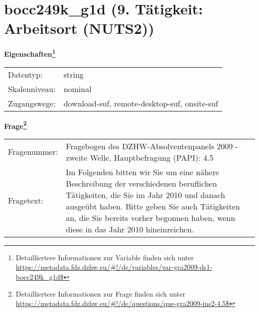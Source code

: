 
    \setcounter{footnote}{0}

    \vspace*{-1.8cm}
	\section{bocc249k\_g1d (9. Tätigkeit: Arbeitsort (NUTS2))}
	\label{section:bocc249k_g1d}



    \vspace*{0.5cm}
    \noindent\textbf{Eigenschaften\footnote{Detailliertere Informationen zur Variable finden sich unter
		\url{https://metadata.fdz.dzhw.eu/\#!/de/variables/var-gra2009-ds1-bocc249k_g1d$}}}\\
	\begin{tabularx}{\hsize}{@{}lX}
	Datentyp: & string \\
	Skalenniveau: & nominal \\
	Zugangswege: &
	  download-suf, 
	  remote-desktop-suf, 
	  onsite-suf
 \\
    \end{tabularx}



				\vspace*{0.5cm}
                \noindent\textbf{Frage\footnote{Detailliertere Informationen zur Frage finden sich unter
		              \url{https://metadata.fdz.dzhw.eu/\#!/de/questions/que-gra2009-ins2-4.5$}}}\\
				\begin{tabularx}{\hsize}{@{}lX}
					Fragenummer: &
					  Fragebogen des DZHW-Absolventenpanels 2009 - zweite Welle, Hauptbefragung (PAPI):
					  4.5
 \\
					Fragetext: & Im Folgenden bitten wir Sie um eine nähere Beschreibung der verschiedenen beruflichen Tätigkeiten, die Sie im Jahr 2010 und danach ausgeübt haben. Bitte geben Sie auch Tätigkeiten an, die Sie bereits vorher begonnen haben, wenn diese in das Jahr 2010 hineinreichen. \\
				\end{tabularx}





